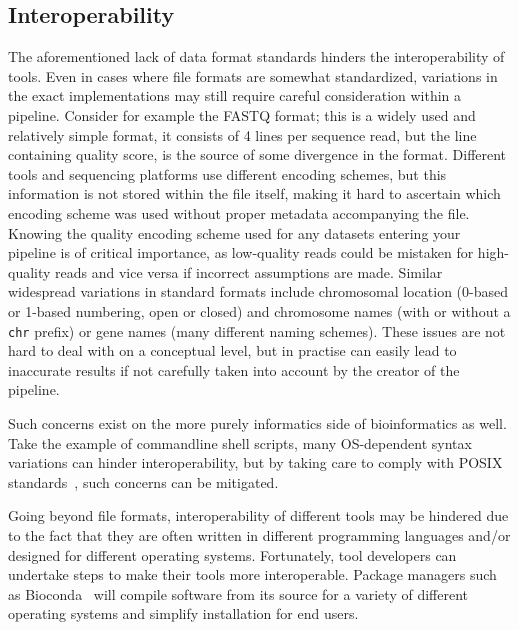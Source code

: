 \begin{justify}

\subsection{Interoperability}

The aforementioned lack of data format standards hinders the interoperability of tools. Even in cases where file formats are somewhat standardized, variations in the exact implementations may still require careful consideration within a pipeline. Consider for example the FASTQ format; this is a widely used and relatively simple format, it consists of 4 lines per sequence read, but the line containing quality score, is the source of some divergence in the format. Different tools and sequencing platforms use different encoding schemes, but this information is not stored within the file itself, making it hard to ascertain which encoding scheme was used without proper metadata accompanying the file. Knowing the quality encoding scheme used for any datasets entering your pipeline is of critical importance, as low-quality reads could be mistaken for high-quality reads and vice versa if incorrect assumptions are made. Similar widespread variations in standard formats include chromosomal location (0-based or 1-based numbering, open or closed) and chromosome names (with or without a \verb+chr+ prefix) or gene names (many different naming schemes). These issues are not hard to deal with on a conceptual level, but in practise can easily lead to inaccurate results if not carefully taken into account by the creator of the pipeline.

Such concerns exist on the more purely informatics side of bioinformatics as well. Take the example of commandline shell scripts, many OS-dependent syntax variations can hinder interoperability, but by taking care to comply with POSIX standards~\cite{walli1995posix}, such concerns can be mitigated.

Going beyond file formats, interoperability of different tools may be hindered due to the fact that they are often written in different programming languages and/or designed for different operating systems. Fortunately, tool developers can undertake steps to make their tools more interoperable. Package managers such as Bioconda~\cite{gruning2017bioconda} will compile software from its source for a variety of different operating systems and simplify installation for end users.


\end{justify}
